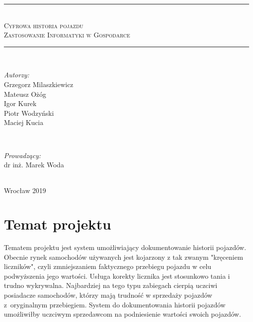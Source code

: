 \documentclass[12pt]{article}
\begin{document}
\begin{titlepage}
\newcommand{\LINE}{\rule{\linewidth}{0.7mm}}
\center
\LINE \\[0.5cm]
\Huge\textsc{Cyfrowa historia pojazdu}\\ [5mm]
\normalsize\textsc{Zastosowanie Informatyki w Gospodarce}  \\[0.5cm]
\LINE \\[3cm]
\begin{minipage}{0.5\textwidth}
\begin{flushleft} \large
\emph{Autorzy:}
		\\Grzegorz Milaszkiewicz %
		\\Mateusz Ożóg %
		\\Igor Kurek
		\\Piotr Wodzyński
		\\Maciej Kucia 
\end{flushleft}
\end{minipage}
~
\begin{minipage}{0.45\textwidth}
\begin{flushright} \large
\emph{Prowadzący:} \\
dr inż. Marek Woda
\end{flushright}
\end{minipage}\\[2cm]
\vfill
\center Wrocław 2019
\end{titlepage}

\renewcommand{\contentsname}{Spis treści}
\tableofcontents
\newpage

\section{Temat projektu}

Tematem projektu jest system umożliwiający dokumentowanie historii pojazdów. Obecnie rynek samochodów używanych jest kojarzony z tak zwanym "kręceniem liczników", czyli zmniejszaniem faktycznego przebiegu pojazdu w celu podwyższenia jego wartości. Usługa korekty licznika jest stosunkowo tania i trudno wykrywalna. Najbardziej na tego typu zabiegach cierpią uczciwi posiadacze samochodów, którzy mają trudność w sprzedaży pojazdów z~oryginalnym przebiegiem. System do dokumentowania historii pojazdów umożliwiłby uczciwym sprzedawcom na podniesienie wartości swoich pojazdów. \\
\end{document}

